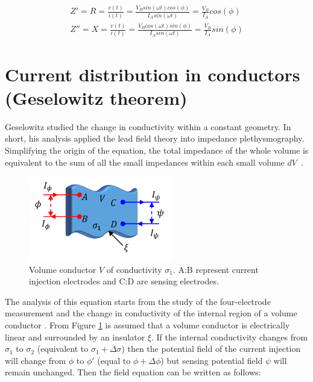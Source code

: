 \begin{align}
	\label{eq:R Z}
	Z' = R = \frac{v(t)}{i(t)} = \frac{V_B sin(\omega t) cos(\phi)}{I_A sin(\omega t)} = \frac{V_B}{I_A}cos(\phi) \\
	\label{eq:X Z}
	Z'' = X = \frac{v(t)}{i(t)} = \frac{V_B cos(\omega t) sin(\phi)}{I_A sin(\omega t)} = \frac{V_B}{I_A}sin(\phi)
\end{align}


\section{Current distribution in conductors (Geselowitz theorem)}  %
\label{section impedance Geselowitz}
Geselowitz \cite{geselowitz1971application} studied the change in conductivity within a constant geometry. In short, his analysis applied the lead field theory into impedance plethysmography. Simplifying the origin of the equation, the total impedance of the whole volume is equivalent to the sum of all the small impedances within each small volume $dV$~\cite{martinsen2011bioimpedance}.

\begin{figure}[!htpb]
	\centering
	\includegraphics[width=6.3cm,keepaspectratio]{figure9}    
	\caption[Volume conductor with 4 electrodes]{Volume conductor $V$ of conductivity $\sigma_1$. A:B represent current injection electrodes and C:D are sensing electrodes.}
	\label{fig:volume}
\end{figure}

The analysis of this equation starts from the study of the four-electrode measurement and the change in conductivity of the internal region of a volume conductor \cite{bertemes2002tissue}. From Figure \ref{fig:volume} is assumed that a volume conductor is electrically linear and surrounded by an insulator $\xi$. If the internal conductivity changes from $\sigma_1$ to $\sigma_2$ (equivalent to $\sigma_1+\Delta \sigma$) then the potential field of the current injection will change from $\phi$ to $\phi \prime$ (equal to $\phi+\Delta \phi$) but sensing potential field $\psi$ will remain unchanged. Then the field equation can be written as follows:

